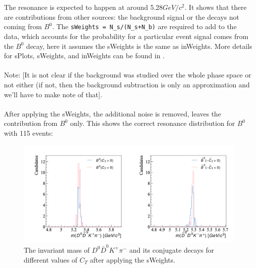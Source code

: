\\
\\
The resonance is expected to happen at around 5.28$GeV/c^2$. It shows that there are contributions from other sources: the background signal or the decays not coming from $B^0$. The \texttt{sWeights = N\_s/(N\_s+N\_b)} are required to add to the data, which accounts for the probability for a particular event signal comes from the $B^0$ decay, here it assumes the sWeights is the same as inWeights. More details for sPlots, sWeights, and inWeights can be found in \autocite{Pivk_2005} \autocite{sPlots}.
\\
\\
Note: [It is not clear if the background was studied over the whole phase space or not either (if not, then the background subtraction is only an approximation and we’ll have to make note of that].
\\
\\
After applying the sWeights, the additional noise is removed, leaves the contribution from $B^0$ only. This shows the correct resonance distribution for $B^0$ with 115 events:
\begin{figure}[h]
\center
\includegraphics*[width=0.96\linewidth]{LHCb_runI/invmass_B0}
\caption{The invariant mass of $D^0\bar{D}^0K^+\pi^-$ and its conjugate decays for different values of $C_T$ after applying the sWeights.}
\label{inv_B0_runi}
\end{figure}
\clearpage
